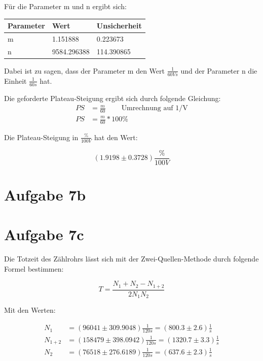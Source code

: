 \documentclass[captions=tableheading]{scrartcl}
\begin{document}
\noindent Für die Parameter m und n ergibt sich:

\begin{center}
    \begin{tabular}{ll@{${}\pm{}$}l}
        \toprule
        Parameter & Wert & Unsicherheit\\
        \midrule
        m &    1.151888 & 0.223673 \\
        n &   9584.296388 & 114.390865 \\
        \bottomrule
        
    \end{tabular}
\end{center}

\noindent Dabei ist zu sagen, dass der Parameter m den Wert $\frac{1}{60Vs}$ und der Parameter n die Einheit $\frac{1}{60s}$ hat.

\noindent Die geforderte Plateau-Steigung ergibt sich durch folgende Gleichung:
\begin{align}
    PS &= \frac{m}{60} \;\;\;\;\;\;\;\;  \text{Umrechnung auf 1/V} \nonumber \\
    PS &= \frac{m}{60}  * 100\%  \nonumber 
\end{align}

\noindent Die Plateau-Steigung in $\frac{\%}{100V}$ hat den Wert:

\begin{displaymath}
    (1.9198 \pm 0.3728) \frac{\%}{100V}
\end{displaymath}

\section{Aufgabe 7b}

\section{Aufgabe 7c}

\noindent Die Totzeit des Zählrohrs lässt sich mit der Zwei-Quellen-Methode durch folgende Formel bestimmen:

\begin{displaymath}
    T = \frac{N_1+N_2-N_{1+2}}{2N_1N_2}
\end{displaymath}

\noindent Mit den Werten:

\begin{align}
    N_1 &= (96041 \pm 309.9048) \frac{1}{120s} = (800.3 \pm 2.6) \frac{1}{s} \nonumber \\
    N_{1+2} &= (158479 \pm 398.0942) \frac{1}{120s} = (1320.7 \pm 3.3) \frac{1}{s} \nonumber \\
    N_2 &= (76518 \pm 276.6189) \frac{1}{120s} = (637.6 \pm 2.3) \frac{1}{s} \nonumber
\end{align}
\end{document}
